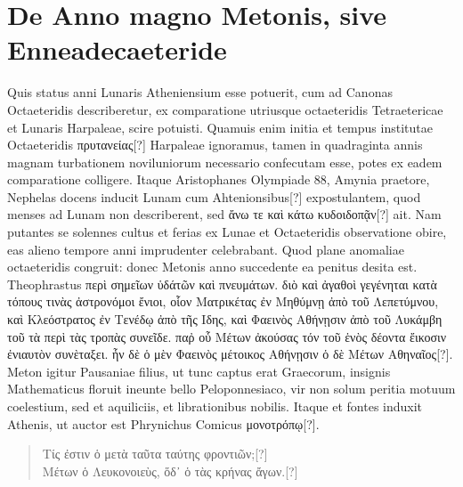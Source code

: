 \section{De Anno magno Metonis, sive Enneadecaeteride}
%
Quis status anni Lunaris Atheniensium esse potuerit, cum ad
Canonas Octaeteridis describeretur, ex comparatione utriusque
octaeteridis Tetraetericae et Lunaris Harpaleae, scire potuisti.
Quamuis enim initia et tempus institutae Octaeteridis 
 \textgreek{πρυτανείας[?]}
Harpaleae ignoramus, tamen in quadraginta annis magnam turbationem
noviluniorum necessario confecutam esse, potes ex eadem
comparatione colligere.
Itaque Aristophanes Olympiade 88, Amynia
praetore, Nephelas docens inducit Lunam cum Ahtenionsibus[?] expostulantem,
quod menses ad Lunam non describerent, sed \textgreek{ἄνω τε καὶ
κάτω κυδοιδοπᾷν[?]}
ait.
Nam putantes se solennes cultus et ferias ex Lunae
et Octaeteridis observatione obire, eas alieno tempore anni imprudenter
celebrabant.
Quod plane anomaliae octaeteridis congruit:
donec Metonis anno succedente ea penitus desita est.
Theophrastus
\textgreek{περὶ σημεῖων ὑδάτῶν καὶ πνευμάτων.}
\textgreek{διὸ καὶ ἀγαθοὶ γεγένηται  κατὰ τόπους τινὰς
ἀστρονόμοι ἔνιοι, οἷον Ματρικέτας ἐν Μηθύμνῃ ἀπὸ τοῦ Λεπετύμνου, καὶ Κλεόστρατος
ἐν Τενέδῳ ἀπὸ τῆς Ιδης, καὶ Φαεινὸς Αθήνῃσιν ἀπὸ τοῦ Λυκάμβη τοῦ τὰ
 περὶ τὰς τροπὰς
συνεῖδε.}
\textgreek{παῤ οὗ Μέτων ἀκούσας τόν τοῦ ἑνὸς δέοντα ἔικοσιν ἐνιαυτὸν
 συνὲταξει}.
\textgreek{ἦν δὲ ὁ μὲν Φαεινὸς μέτοικος Αθήνῃσιν ὁ δὲ Μέτων Αθηναῖος[?]}.
Meton igitur Pausaniae filius, ut tunc captus erat Graecorum,
 insignis Mathematicus
floruit ineunte bello Peloponnesiaco, vir non solum peritia motuum
coelestium, sed et aquiliciis, et librationibus nobilis.
Itaque et
fontes induxit Athenis, ut auctor est
 Phrynichus Comicus \textgreek{μονοτρόπῳ[?]}.
\begin{verse}
\textgreek{Τίς ἐστιν ὁ μετὰ ταῦτα ταύτης φροντιῶν;[?]}\\
%
%
\textgreek{Μέτων ὁ Λευκονοιεὺς, ὅδ᾽ ὁ τὰς κρήνας ἄγων.[?]}
\end{verse}
